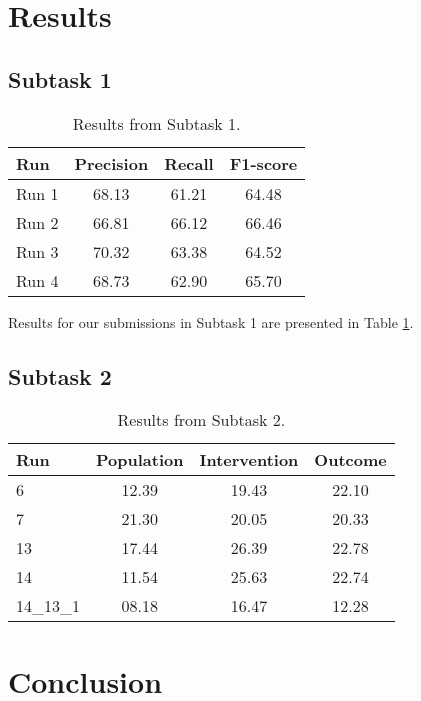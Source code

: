\documentclass[11pt]{article}
\begin{document}
\section{Results}

\subsection{Subtask 1}

\begin{table}[ht]
    \centering
    \begin{tabular}{lccc}
        \toprule
        Run & Precision & Recall & F1-score \\
        \midrule
        Run 1 & 68.13 & 61.21 & 64.48 \\
        Run 2 & 66.81 & 66.12 & 66.46 \\
        Run 3 & 70.32 & 63.38 & 64.52 \\
        Run 4 & 68.73 & 62.90 & 65.70 \\
        \bottomrule
    \end{tabular}
    \caption{Results from Subtask 1.}
    \label{tab:task_1}
\end{table}

Results for our submissions in Subtask 1 are presented in Table \ref{tab:task_1}.

\subsection{Subtask 2}

\begin{table}[ht]
    \centering
    \begin{tabular}{lccc}
        \toprule
        Run & Population & Intervention & Outcome \\
        \midrule
        6 & 12.39 & 19.43 & 22.10 \\
        7 & 21.30 & 20.05 & 20.33 \\
        13 & 17.44 & 26.39 & 22.78 \\
        14 & 11.54 & 25.63 & 22.74 \\
        14\_13\_1 & 08.18 & 16.47 & 12.28 \\
        \bottomrule
    \end{tabular}
    \caption{Results from Subtask 2.}
    \label{tab:task_2}
\end{table}


\section{Conclusion}
\end{document}
